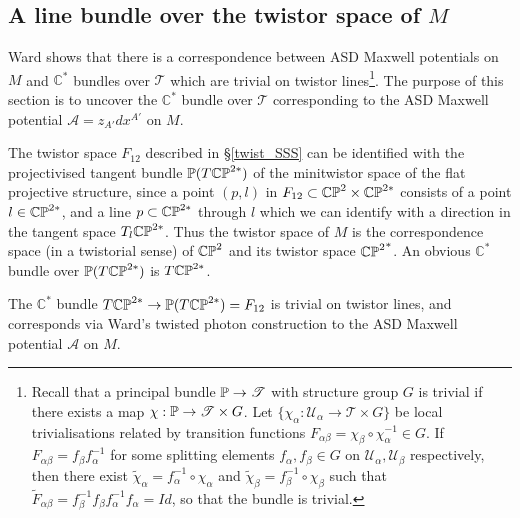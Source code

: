 \subsection{A line bundle over the twistor space of $M$}
Ward \cite{wardtf} shows that there is a correspondence between ASD Maxwell potentials on $M$ and $\mathbb{C}^*$ bundles over $\mathscr{T}$ which are trivial on twistor lines\footnote{Recall that a principal bundle $\mathbb{P}\rightarrow\mathscr{T}$ with structure group $G$ is trivial if there exists a map $\chi:\mathbb{P}\rightarrow\mathscr{T}\times G$. Let $\{\chi_\alpha:\mathcal{U}_\alpha\rightarrow\mathscr{T}\times G\}$ be local trivialisations related by transition functions $F_{\alpha\beta}=\chi_\beta\circ\chi^{-1}_\alpha\in G$. If $F_{\alpha\beta}=f_\beta f_\alpha^{-1}$ for some splitting elements $f_\alpha,f_\beta\in G$ on $\mathcal{U}_\alpha,\mathcal{U}_\beta$ respectively, then there exist $\tilde{\chi}_\alpha=f_\alpha^{-1}\circ\chi_\alpha$ and $\tilde{\chi}_\beta=f_\beta^{-1}\circ\chi_\beta$ such that $\tilde{F}_{\alpha\beta}=f_\beta^{-1}f_\beta f_\alpha^{-1}f_\alpha=Id$, so that the bundle is trivial.}. The purpose of this section is to uncover the $\mathbb{C}^*$ bundle over $\mathscr{T}$ corresponding to the ASD Maxwell potential $\mathcal{A}=z_{A'}dx^{A'}$ on $M$.

The twistor space $F_{12}$ described in \S\ref{twist_SSS} can be identified with the projectivised tangent bundle ${\mathbb{P}(T\mathbb{CP}^{2*})}$ of the minitwistor space of the flat projective structure, since a point $(p,l)$ in $F_{12}\subset\mathbb{CP}^2\times\mathbb{CP}^{2*}$ consists of a point $l\in\mathbb{CP}^{2*}$, and a line $p\subset\mathbb{CP}^{2*}$ through $l$ which we can identify with a direction in the tangent space $T_l\mathbb{CP}^{2*}$. Thus the twistor space of $M$ is the correspondence space (in a twistorial sense) of $\mathbb{CP}^2$ and its twistor space ${\mathbb{CP}^2}^*$. An obvious $\mathbb{C}^*$ bundle over ${\mathbb{P}(T\mathbb{CP}^{2*})}$ is $T\mathbb{CP}^{2*}$.

\begin{prop}
The $\mathbb{C}^*$ bundle $T\mathbb{CP}^{2*}\rightarrow\mathbb{P}(T\mathbb{CP}^{2*})=F_{12}$ is trivial on twistor lines, and corresponds via Ward's twisted photon construction to the ASD Maxwell potential $\mathcal{A}$ on $M$.
\end{prop}
 
